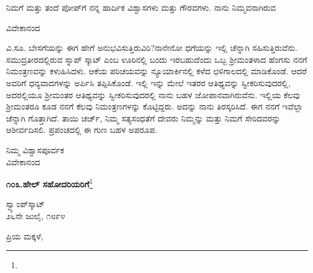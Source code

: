 ನಿಮಗೆ ಮತ್ತು ತಂದೆ ಪೋಪ್‌ಗೆ ನನ್ನ ಹಾರ್ದಿಕ ವಿಶ್ವಾಸಗಳು ಮತ್ತು ಗೌರವಗಳು. ನಾನು ನಿಮ್ಮವನಾಗಿರುವ

\vspace{-0.5cm}

\begin{flushright}
ವಿವೇಕಾನಂದ
\end{flushright}

ವಿ.ಸೂ. \enginline{-}ಬೇಸಗೆಯನ್ನು ಈಗ ಹೇಗೆ ಅನುಭವಿಸುತ್ತಿರುವಿರಿ?ನಾನೇನೋ ಧಗೆಯನ್ನು ಇಲ್ಲಿ ಚೆನ್ನಾಗಿ ಸಹಿಸುತ್ತಿರುವೆನು. ಸಮುದ್ರತೀರದಲ್ಲಿರುವ ಸ್ನಾಪ್ ಸ್ಕಾಟ್ ಎಂಬ ಊರಿನಲ್ಲಿ ಬಂದು ಇರಬಹುದೆಂದು ಒಬ್ಬ ಶ‍್ರೀಮಂತಳಾದ ಹೆಂಗಸು ನನಗೆ ನಿಮಂತ್ರಣವನ್ನು ಕಳುಹಿಸಿದಳು. ಆಕೆಯ ಪರಿಚಯವನ್ನು ನ್ಯೂಯಾರ್ಕಿನಲ್ಲಿ ಕಳೆದ ಛಳಿಗಾಲದಲ್ಲಿ ಮಾಡಿಕೊಂಡೆ. ಆದರೆ ಅವರಿಗೆ ಧನ್ಯವಾದಗಳನ್ನು ಅರ್ಪಿಸಿ ತಪ್ಪಿಸಿಕೊಂಡೆ. ಇಲ್ಲಿ ಇನ್ನು ಮೇಲೆ ಇತರರ ಆತಿಥ್ಯವನ್ನು ಸ್ವೀಕರಿಸುವುದರಲ್ಲಿ, ಅದರಲ್ಲಿಯೂ ಶ‍್ರೀಮಂತರ ಆತಿಥ್ಯವನ್ನು ಸ್ವೀಕರಿಸುವುದರಲ್ಲಿ ನಾನು ಬಹಳ ಜೋಪಾನವಾಗಿರುವೆನು. ಇಲ್ಲಿಯ ಕೆಲವು ಶ‍್ರೀಮಂತರೂ ಕೂಡ ನನಗೆ ಕೆಲವು ನಿಮಂತ್ರಣಗಳನ್ನು ಕೊಟ್ಟಿದ್ದರು. ಅದನ್ನು ನಾನು ತಿರಸ್ಕರಿಸಿದೆ. ಈಗ ನನಗೆ ಇವೆಲ್ಲಾ ಚೆನ್ನಾಗಿ ಗೊತ್ತಾಗಿದೆ. ತಾಯಿ ಚರ್ಚ್, ನಿಮ್ಮ ಸತ್ಯಸಂಧತೆಗೆ ದೇವರು ನಿಮ್ಮನ್ನು ಮತ್ತು ನಿಮಗೆ ಸೇರಿದವರನ್ನು ಆಶೀರ್ವದಿಸಲಿ. ಪ್ರಪಂಚದಲ್ಲಿ ಈ ಗುಣ ಬಹಳ ಅಪರೂಪ.

\vspace{-0.5cm}

{\flushright
ನಿಮ್ಮ ವಿಶ್ವಾಸಪೂರ್ವಕ\\ವಿವೇಕಾನಂದ\par}

\begin{center}
\textbf{೧೦೩.ಹೇಲ್ ಸಹೋದರಿಯರಿಗೆ}\footnote{}
\end{center}

\vspace{-0.5cm}

\begin{flushright}
ಸ್ವ್ಯಾಂಪ್‌ಸ್ಕಾಟ್\\೨೬ನೇ ಜುಲೈ, ೧೮೯೪
\end{flushright}

\vspace{-0.5cm}

\noindent
ಪ್ರಿಯ ಮಕ್ಕಳೆ,

